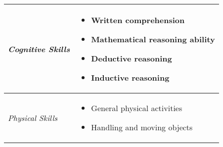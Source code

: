 \begin{tabular}{@{}p{4cm}p{11cm}@{}}
    \midrule
    \textit{Cognitive Skills} & 
    \begin{itemize}
      \item Written comprehension
      \item Mathematical reasoning ability
      \item Deductive reasoning
      \item Inductive reasoning
    \end{itemize} \\
    
    \midrule
    \textit{Physical Skills} & 
    \begin{itemize}
      \item General physical activities
      \item Handling and moving objects
    \end{itemize} \\
    \bottomrule
    \end{tabular}

    